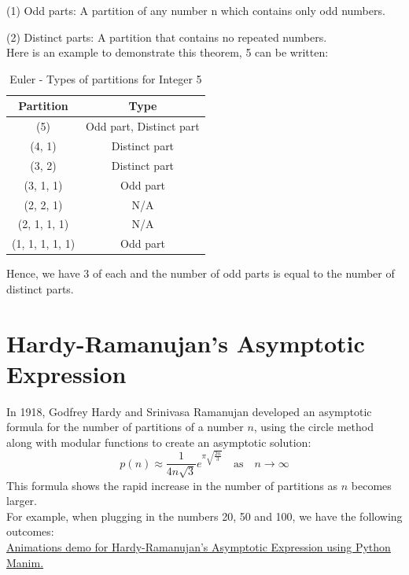 \documentclass{article}
\theoremstyle{definition}
\theoremstyle{question}
\begin{document}
\noindent (1) Odd parts: A partition of any number n which contains only odd numbers.

\noindent (2) Distinct parts: A partition that contains no repeated numbers. \\

\noindent Here is an example to demonstrate this theorem, 5 can be written:
\begin{table}[h]
    \centering 
    \begin{tabular}{|c|c|}
    \hline
    Partition & Type \\
    \hline
    (5) & Odd part, Distinct part \\
    (4, 1) & Distinct part \\
    (3, 2) & Distinct part \\
    (3, 1, 1) & Odd part \\
    (2, 2, 1) & N/A \\
    (2, 1, 1, 1) & N/A \\
    (1, 1, 1, 1, 1) & Odd part \\
    \hline
    \end{tabular}
    \caption{Euler - Types of partitions for Integer 5}
\end{table}
    
\noindent Hence, we have 3 of each and the number of odd parts is equal to the number of distinct parts.

\newpage
\section{Hardy-Ramanujan’s Asymptotic Expression}
In 1918, Godfrey Hardy and Srinivasa Ramanujan developed an asymptotic formula for the number of partitions of a number \( n\), using the circle method along with modular functions to create an asymptotic solution:
\[
p(n) \approx \frac{1}{4n\sqrt{3}} e^{\pi \sqrt{\frac{2n}{3}}} \quad \text{as} \quad n \to \infty
\]
This formula shows the rapid increase in the number of partitions as \( n \) becomes larger.\\

\noindent For example, when plugging in the numbers 20, 50 and 100, we have the following outcomes:\\

\noindent \href{https://youtu.be/UYjqhT5xnsY}{Animations demo for Hardy-Ramanujan’s Asymptotic Expression using Python Manim.}\cite{manim}
\end{document}

